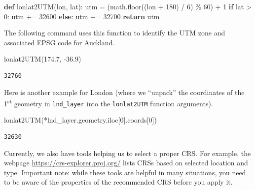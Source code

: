 \documentclass[
  letterpaper,
]{krantz}
\newenvironment{Shaded}{\begin{snugshade}}{\end{snugshade}}
\newcommand{\ControlFlowTok}[1]{\textcolor[rgb]{0.00,0.23,0.31}{\textbf{#1}}}
\newcommand{\DecValTok}[1]{\textcolor[rgb]{0.68,0.00,0.00}{#1}}
\newcommand{\FloatTok}[1]{\textcolor[rgb]{0.68,0.00,0.00}{#1}}
\newcommand{\KeywordTok}[1]{\textcolor[rgb]{0.00,0.23,0.31}{\textbf{#1}}}
\newcommand{\NormalTok}[1]{\textcolor[rgb]{0.00,0.23,0.31}{#1}}
\newcommand{\OperatorTok}[1]{\textcolor[rgb]{0.37,0.37,0.37}{#1}}
\begin{document}
\begin{Shaded}
\begin{Highlighting}[]
\KeywordTok{def}\NormalTok{ lonlat2UTM(lon, lat):}
\NormalTok{    utm }\OperatorTok{=}\NormalTok{ (math.floor((lon }\OperatorTok{+} \DecValTok{180}\NormalTok{) }\OperatorTok{/} \DecValTok{6}\NormalTok{) }\OperatorTok{\%} \DecValTok{60}\NormalTok{) }\OperatorTok{+} \DecValTok{1}
    \ControlFlowTok{if}\NormalTok{ lat }\OperatorTok{\textgreater{}} \DecValTok{0}\NormalTok{:}
\NormalTok{        utm }\OperatorTok{+=} \DecValTok{32600}
    \ControlFlowTok{else}\NormalTok{:}
\NormalTok{        utm }\OperatorTok{+=} \DecValTok{32700}
    \ControlFlowTok{return}\NormalTok{ utm}
\end{Highlighting}
\end{Shaded}

The following command uses this function to identify the UTM zone and
associated EPSG code for Auckland.

\begin{Shaded}
\begin{Highlighting}[]
\NormalTok{lonlat2UTM(}\FloatTok{174.7}\NormalTok{, }\OperatorTok{{-}}\FloatTok{36.9}\NormalTok{)}
\end{Highlighting}
\end{Shaded}

\begin{verbatim}
32760
\end{verbatim}

Here is another example for London (where we ``unpack'' the coordinates
of the 1\textsuperscript{st} geometry in \texttt{lnd\_layer} into the
\texttt{lonlat2UTM} function arguments).

\begin{Shaded}
\begin{Highlighting}[]
\NormalTok{lonlat2UTM(}\OperatorTok{*}\NormalTok{lnd\_layer.geometry.iloc[}\DecValTok{0}\NormalTok{].coords[}\DecValTok{0}\NormalTok{])}
\end{Highlighting}
\end{Shaded}

\begin{verbatim}
32630
\end{verbatim}

Currently, we also have tools helping us to select a proper CRS. For
example, the webpage \url{https://crs-explorer.proj.org/} lists CRSs
based on selected location and type. Important note: while these tools
are helpful in many situations, you need to be aware of the properties
of the recommended CRS before you apply it.
\end{document}
